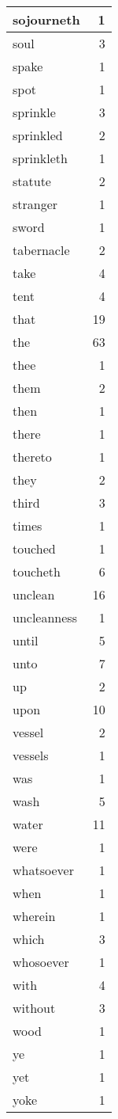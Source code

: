 \begin{center}
\begin{longtable}{l|r}
sojourneth & 1 \\ \hline
soul & 3 \\ \hline
spake & 1 \\ \hline
spot & 1 \\ \hline
sprinkle & 3 \\ \hline
sprinkled & 2 \\ \hline
sprinkleth & 1 \\ \hline
statute & 2 \\ \hline
stranger & 1 \\ \hline
sword & 1 \\ \hline
tabernacle & 2 \\ \hline
take & 4 \\ \hline
tent & 4 \\ \hline
that & 19 \\ \hline
the & 63 \\ \hline
thee & 1 \\ \hline
them & 2 \\ \hline
then & 1 \\ \hline
there & 1 \\ \hline
thereto & 1 \\ \hline
they & 2 \\ \hline
third & 3 \\ \hline
times & 1 \\ \hline
touched & 1 \\ \hline
toucheth & 6 \\ \hline
unclean & 16 \\ \hline
uncleanness & 1 \\ \hline
until & 5 \\ \hline
unto & 7 \\ \hline
up & 2 \\ \hline
upon & 10 \\ \hline
vessel & 2 \\ \hline
vessels & 1 \\ \hline
was & 1 \\ \hline
wash & 5 \\ \hline
water & 11 \\ \hline
were & 1 \\ \hline
whatsoever & 1 \\ \hline
when & 1 \\ \hline
wherein & 1 \\ \hline
which & 3 \\ \hline
whosoever & 1 \\ \hline
with & 4 \\ \hline
without & 3 \\ \hline
wood & 1 \\ \hline
ye & 1 \\ \hline
yet & 1 \\ \hline
yoke & 1 \\ \hline
\end{longtable}
\end{center}



